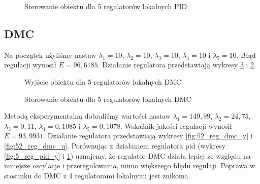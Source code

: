 \begin{figure}[H]
\centering
{}
\caption{Sterowanie obiektu dla 5 regulatorów lokalnych PID}
\label{fig:5_reg_pid_u}
\end{figure}

\subsection{DMC}
Na początek użyliśmy nastaw $\lambda_1=10$, $\lambda_2=10$, $\lambda_3=10$, $\lambda_4=10$ i $\lambda_5=10$. Błąd regulacji wynosił $E=96,6185$. Działanie regulatora przedstawiają wykresy \ref{fig:51_reg_dmc_u} i \ref{fig:51_reg_dmc_y}.

\begin{figure}[H]
\centering
{}
\caption{Wyjście obiektu dla 5 regulatorów lokalnych DMC}
\label{fig:51_reg_dmc_y}
\end{figure}

\begin{figure}[H]
\centering
{}
\caption{Sterowanie obiektu dla 5 regulatorów lokalnych DMC}
\label{fig:51_reg_dmc_u}
\end{figure}

Metodą eksperymentalną dobraliśmy wartości nastaw $\lambda_1=149,99$, $\lambda_2=24,75$, $\lambda_3=0,11$,  $\lambda_4=0,1085$ i $\lambda_5=0,1078$. Wskaźnik jakości regulacji wynosił $E=93,9931$. Działanie regulatora przedstawiają wykresy \ref{fig:52_reg_dmc_y} i \ref{fig:52_reg_dmc_u}. Porównując z działaniem regulatora pid (wykresy \ref{fig:5_reg_pid_y} i \ref{fig:5_reg_pid_u}) uznajemy, że regulator DMC działa lepiej ze względu na mniejsze oscylacje i przeregulowania, mimo większego błędu regulaji. Poprawa w stosunku do DMC z 4 regulatorami lokalnymi jest znikoma.

